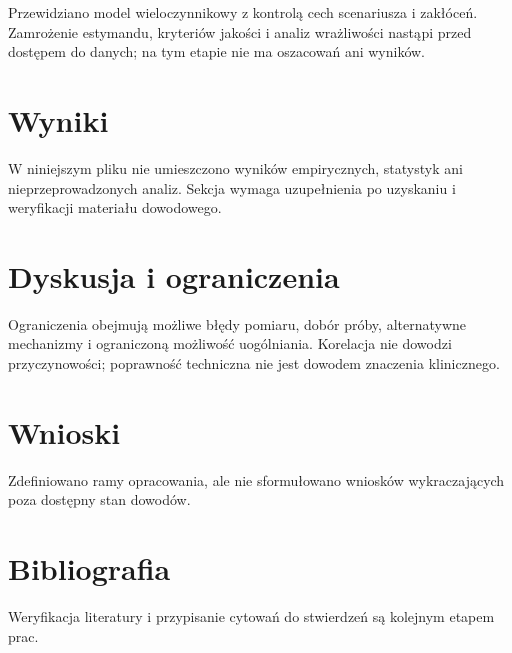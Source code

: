 \documentclass[11pt,a4paper]{article}
\begin{document}
Przewidziano model wieloczynnikowy z kontrolą cech scenariusza i zakłóceń. Zamrożenie estymandu, kryteriów jakości i analiz wrażliwości nastąpi przed dostępem do danych; na tym etapie nie ma oszacowań ani wyników.

\section{Wyniki}

W niniejszym pliku nie umieszczono wyników empirycznych, statystyk ani nieprzeprowadzonych analiz. Sekcja wymaga uzupełnienia po uzyskaniu i weryfikacji materiału dowodowego.

\section{Dyskusja i ograniczenia}

Ograniczenia obejmują możliwe błędy pomiaru, dobór próby, alternatywne mechanizmy i ograniczoną możliwość uogólniania. Korelacja nie dowodzi przyczynowości; poprawność techniczna nie jest dowodem znaczenia klinicznego.

\section{Wnioski}

Zdefiniowano ramy opracowania, ale nie sformułowano wniosków wykraczających poza dostępny stan dowodów.

\section*{Bibliografia}

Weryfikacja literatury i przypisanie cytowań do stwierdzeń są kolejnym etapem prac.
\end{document}
